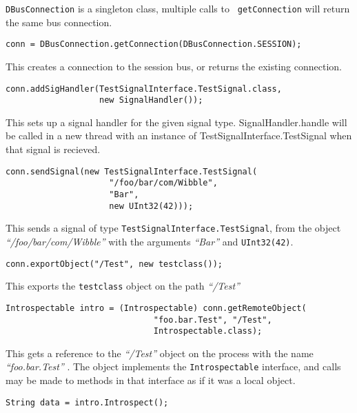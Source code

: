 \documentclass[a4paper,12pt]{article}
\begin{document}
{\tt DBusConnection} is a singleton class, multiple calls to {\tt
getConnection} will return the same bus connection. 

\begin{verbatim}
conn = DBusConnection.getConnection(DBusConnection.SESSION);
\end{verbatim}

This creates a connection to the session bus, or returns the
existing connection.

\begin{verbatim}
conn.addSigHandler(TestSignalInterface.TestSignal.class,
                   new SignalHandler());
\end{verbatim}

This sets up a signal handler for the given signal type.
SignalHandler.handle will be called in a new thread with an instance
of TestSignalInterface.TestSignal when that signal is recieved.

\begin{verbatim}
conn.sendSignal(new TestSignalInterface.TestSignal(
                     "/foo/bar/com/Wibble", 
                     "Bar", 
                     new UInt32(42)));
\end{verbatim}

This sends a signal of type {\tt TestSignalInterface.TestSignal},
from the object {\em ``/foo/bar/com/Wibble''} with the arguments {\em
``Bar''} and {\tt UInt32(42)}.

\begin{verbatim}
conn.exportObject("/Test", new testclass());
\end{verbatim}

This exports the {\tt testclass} object on the path {\em ``/Test''}

\begin{verbatim}
Introspectable intro = (Introspectable) conn.getRemoteObject(
                              "foo.bar.Test", "/Test",
                              Introspectable.class);
\end{verbatim}

This gets a reference to the {\em ``/Test''} object on the process with the
name {\em ``foo.bar.Test''} . The object implements the {\tt Introspectable}
interface, and calls may be made to methods in that interface as if it was a
local object.

\begin{verbatim}
String data = intro.Introspect();
\end{verbatim}
\end{document}
